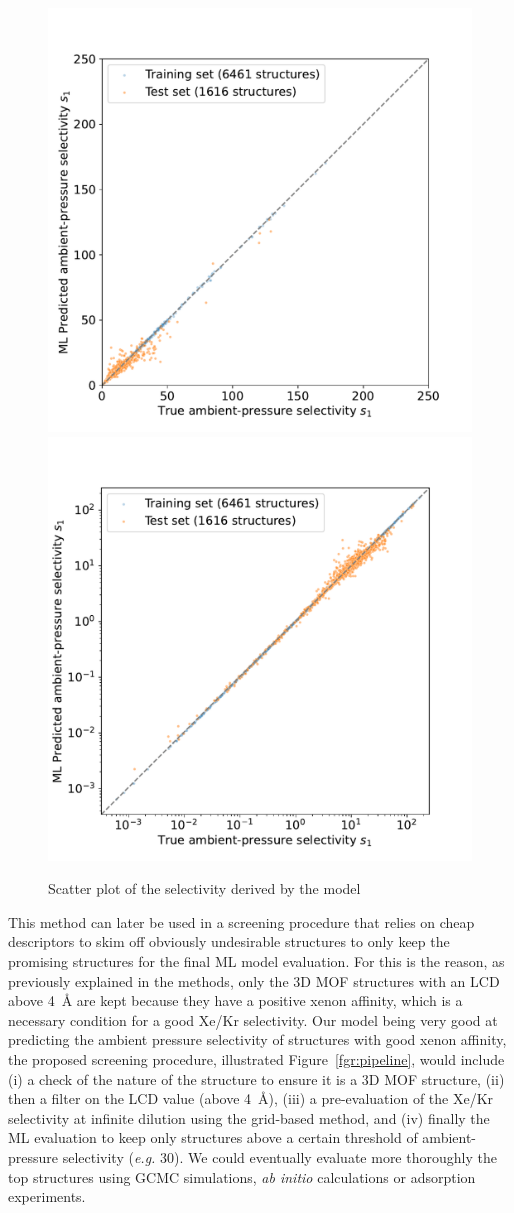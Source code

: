 \documentclass[main]{subfiles}
\begin{document}
\begin{figure}[ht]
  \centering
    \includegraphics[width=0.48\linewidth]{figures/4-ml/SI_figure/Scatterplot_S1_prediction.pdf}
    \includegraphics[width=0.48\linewidth]{figures/4-ml/SI_figure/Scatterplot_S1_prediction_logscale.pdf}
    \caption{Scatter plot of the selectivity derived by the model}\label{fgr:S1_prediction}
  \end{figure}

This method can later be used in a screening procedure that relies on cheap descriptors to skim off obviously undesirable structures to only keep the promising structures for the final ML model evaluation. For this is the reason, as previously explained in the methods, only the 3D MOF structures with an LCD above \SI{4}{\angstrom} are kept because they have a positive xenon affinity, which is a necessary condition for a good Xe/Kr selectivity. Our model being very good at predicting the ambient pressure selectivity of structures with good xenon affinity, the proposed screening procedure, illustrated Figure~\ref{fgr:pipeline}, would include (i) a check of the nature of the structure to ensure it is a 3D MOF structure, (ii) then a filter on the LCD value (above \SI{4}{\angstrom}), (iii) a pre-evaluation of the Xe/Kr selectivity at infinite dilution using the grid-based method, and (iv) finally the ML evaluation to keep only structures above a certain threshold of ambient-pressure selectivity (\emph{e.g.} 30). We could eventually evaluate more thoroughly the top structures using GCMC simulations, \emph{ab initio} calculations or adsorption experiments.
\end{document}
